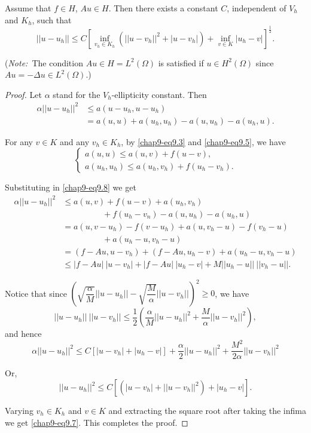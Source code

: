 \begin{theorem}[FALK]\label{chap9-thm9.1}
Assume that $f\in H$, $Au\in H$. Then there exists a constant $C$,
independent of $V_{h}$ and $K_{h}$, such that
\begin{equation*}
||u-u_{h}||\leq C\left[\inf\limits_{v_{h}\in
    K_{h}}(||u-v_{h}||^{2}+|u-v_{h}|)+\inf\limits_{v\in
    K}|u_{h}-v|\right]^{\frac{1}{2}}.\tag{9.7}\label{chap9-eq9.7} 
\end{equation*}
\end{theorem}

\noindent
({\em Note:}~The condition $Au\in H=L^{2}(\Omega)$ is satisfied if
$u\in H^{2}(\Omega)$ since $Au=-\Delta u\in L^{2}(\Omega).$)

\begin{proof}
Let $\alpha$ stand for the $V_{h}$-ellipticity constant. Then
\begin{align*}
\alpha || u- u_{h}||^{2} &\leq a(u-u_{h},u-u_{h})\\
&=a(u,u)+a(u_{h},u_{h})-a(u,u_{h})-a(u_{h},u).\tag{9.8}\label{chap9-eq9.8} 
\end{align*}

For any $v\in K$ and any $v_{h}\in K_{h}$, by \eqref{chap9-eq9.3} and
\eqref{chap9-eq9.5}, we have
\begin{equation*}
\begin{cases}
a(u,u)\leq a(u,v)+f(u-v),\\
a(u_{h},u_{h})\leq a(u_{h},v_{h})+f(u_{h}-v_{h}).
\end{cases}\tag{9.9}\label{chap9-eq9.9} 
\end{equation*}

Substituting in \eqref{chap9-eq9.8} we get
\begin{align*}
\alpha ||u-u_{h}||^{2} &\leq
a(u,v)+f(u-v)+a(u_{h},v_{h})\\
& \hspace{2cm}  + f(u_{h}-v_{n})-a(u,u_{h})-a(u_{h},u)\\ 
&= a(u,v-u_{h})-f(v-u_{h})+a(u,v_{h}-u)-f(v_{h}-u)\\
& \hspace{2cm} +a(u_{h}-u,v_{h}-u)\\
&= (f-Au,u-v_{h})+(f-Au,u_{h}-v)+a(u_{h}-u,v_{h}-u)\\
&\leq |f-Au|~|u-v_{h}|+|f-Au|~|u_{h}-v|+M||u_{h}-u||~||v_{h}-u||.
\end{align*}\pageoriginale

Notice that since
$(\sqrt{\dfrac{\alpha}{M}}||u-u_{h}||-\sqrt{\dfrac{M}{\alpha}}||u-v_{h}||)^{2}\geq
0$, we have
$$
||u-u_{h}||~||u-v_{h}||\leq \frac{1}{2}\left(\frac{\alpha}{M}||u-u_{h}||^{2}+\frac{M}{\alpha}||u-v_{h}||^{2}\right),
$$
and hence
$$
\alpha||u-u_{h}||^{2}\leq
C[|u-v_{h}|+|u_{h}-v|]+\frac{\alpha}{2}||u-u_{h}||^{2}+\frac{M^{2}}{2\alpha}||u-v_{h}||^{2} 
$$

Or,
$$
||u-u_{h}||^{2}\leq C[(|u-v_{h}|+||u-v_{h}||^{2})+|u_{h}-v|].
$$

Varying $v_{h}\in K_{h}$ and $v\in K$ and extracting the square root
after taking the infima we get \eqref{chap9-eq9.7}. This completes the
proof. 
\end{proof}

